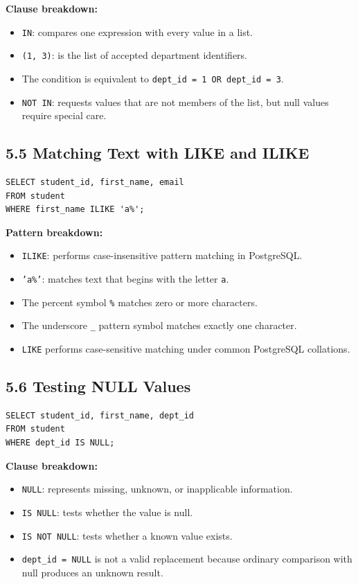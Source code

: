 \documentclass[12pt,a4paper]{article}
\begin{document}
\noindent\textbf{Clause breakdown:}
\begin{itemize}
    \item \texttt{IN}: compares one expression with every value in a list.
    \item \texttt{(1, 3)}: is the list of accepted department identifiers.
    \item The condition is equivalent to \texttt{dept\_id = 1 OR dept\_id = 3}.
    \item \texttt{NOT IN}: requests values that are not members of the list, but null values require
    special care.
\end{itemize}

\subsection*{5.5 Matching Text with LIKE and ILIKE}
\begin{verbatim}
SELECT student_id, first_name, email
FROM student
WHERE first_name ILIKE 'a%';
\end{verbatim}

\noindent\textbf{Pattern breakdown:}
\begin{itemize}
    \item \texttt{ILIKE}: performs case-insensitive pattern matching in PostgreSQL.
    \item \texttt{'a\%'}: matches text that begins with the letter \texttt{a}.
    \item The percent symbol \texttt{\%} matches zero or more characters.
    \item The underscore \texttt{\_} pattern symbol matches exactly one character.
    \item \texttt{LIKE} performs case-sensitive matching under common PostgreSQL collations.
\end{itemize}

\subsection*{5.6 Testing NULL Values}
\begin{verbatim}
SELECT student_id, first_name, dept_id
FROM student
WHERE dept_id IS NULL;
\end{verbatim}

\noindent\textbf{Clause breakdown:}
\begin{itemize}
    \item \texttt{NULL}: represents missing, unknown, or inapplicable information.
    \item \texttt{IS NULL}: tests whether the value is null.
    \item \texttt{IS NOT NULL}: tests whether a known value exists.
    \item \texttt{dept\_id = NULL} is not a valid replacement because ordinary comparison with
    null produces an unknown result.
\end{itemize}
\end{document}
